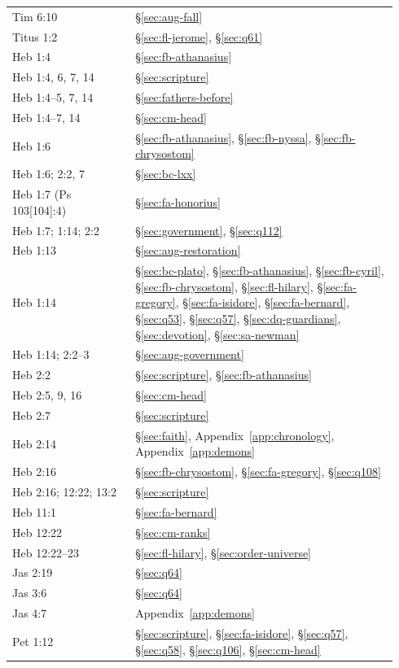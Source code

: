 \begin{longtable}{>{\raggedright\arraybackslash}p{0.30\linewidth}>{\raggedright\arraybackslash}p{0.64\linewidth}}
1 Tim 6:10 & \S\ref{sec:aug-fall}\\
Titus 1:2 & \S\ref{sec:fl-jerome}, \S\ref{sec:q61}\\
Heb 1:4 & \S\ref{sec:fb-athanasius}\\
Heb 1:4, 6, 7, 14 & \S\ref{sec:scripture}\\
Heb 1:4--5, 7, 14 & \S\ref{sec:fathers-before}\\
Heb 1:4--7, 14 & \S\ref{sec:cm-head}\\
Heb 1:6 & \S\ref{sec:fb-athanasius}, \S\ref{sec:fb-nyssa}, \S\ref{sec:fb-chrysostom}\\
Heb 1:6; 2:2, 7 & \S\ref{sec:bc-lxx}\\
Heb 1:7 (Ps 103[104]:4) & \S\ref{sec:fa-honorius}\\
Heb 1:7; 1:14; 2:2 & \S\ref{sec:government}, \S\ref{sec:q112}\\
Heb 1:13 & \S\ref{sec:aug-restoration}\\
Heb 1:14 & \S\ref{sec:bc-plato}, \S\ref{sec:fb-athanasius}, \S\ref{sec:fb-cyril}, \S\ref{sec:fb-chrysostom}, \S\ref{sec:fl-hilary}, \S\ref{sec:fa-gregory}, \S\ref{sec:fa-isidore}, \S\ref{sec:fa-bernard}, \S\ref{sec:q53}, \S\ref{sec:q57}, \S\ref{sec:dq-guardians}, \S\ref{sec:devotion}, \S\ref{sec:sa-newman}\\
Heb 1:14; 2:2--3 & \S\ref{sec:aug-government}\\
Heb 2:2 & \S\ref{sec:scripture}, \S\ref{sec:fb-athanasius}\\
Heb 2:5, 9, 16 & \S\ref{sec:cm-head}\\
Heb 2:7 & \S\ref{sec:scripture}\\
Heb 2:14 & \S\ref{sec:faith}, Appendix~\ref{app:chronology}, Appendix~\ref{app:demons}\\
Heb 2:16 & \S\ref{sec:fb-chrysostom}, \S\ref{sec:fa-gregory}, \S\ref{sec:q108}\\
Heb 2:16; 12:22; 13:2 & \S\ref{sec:scripture}\\
Heb 11:1 & \S\ref{sec:fa-bernard}\\
Heb 12:22 & \S\ref{sec:cm-ranks}\\
Heb 12:22--23 & \S\ref{sec:fl-hilary}, \S\ref{sec:order-universe}\\
Jas 2:19 & \S\ref{sec:q64}\\
Jas 3:6 & \S\ref{sec:q64}\\
Jas 4:7 & Appendix~\ref{app:demons}\\
1 Pet 1:12 & \S\ref{sec:scripture}, \S\ref{sec:fa-isidore}, \S\ref{sec:q57}, \S\ref{sec:q58}, \S\ref{sec:q106}, \S\ref{sec:cm-head}\\

\end{longtable}
